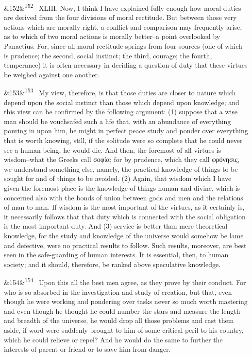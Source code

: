\documentclass[12pt]{article}
\newcommand{\para}[1][]{\par\noindent\ifx&#1&\else\textsuperscript{\footnotesize #1}~\fi}
\begin{document}
\para[152] XLIII. Now, I think I have explained fully enough how moral duties are derived from the four divisions of moral rectitude. But between those very actions which are morally right, a conflict and comparison may frequently arise, as to which of two moral actions is morally better--a point overlooked by Panaetius. For, since all moral rectitude springs from four sources (one of which is prudence; the second, social instinct; the third, courage; the fourth, temperance) it is often necessary in deciding a question of duty that these virtues be weighed against one another.

\para[153] My view, therefore, is that those duties are closer to nature which depend upon the social instinct than those which depend upon knowledge; and this view can be confirmed by the following argument: (1) suppose that a wise man should be vouchsafed such a life that, with an abundance of everything pouring in upon him, he might in perfect peace study and ponder over everything that is worth knowing, still, if the solitude were so complete that he could never see a human being, he would die. And then, the foremost of all virtues is wisdom--what the Greeks call σοφία; for by prudence, which they call φρόνησις, we understand something else, namely, the practical knowledge of things to be sought for and of things to be avoided. (2) Again, that wisdom which I have given the foremost place is the knowledge of things human and divine, which is concerned also with the bonds of union between gods and men and the relations of man to man. If wisdom is the most important of the virtues, as it certainly is, it necessarily follows that that duty which is connected with the social obligation is the most important duty. And (3) service is better than mere theoretical knowledge, for the study and knowledge of the universe would somehow be lame and defective, were no practical results to follow. Such results, moreover, are best seen in the safe-guarding of human interests. It is essential, then, to human society; and it should, therefore, be ranked above speculative knowledge.

\para[154] Upon this all the best men agree, as they prove by their conduct. For who is so absorbed in the investigation and study of creation, but that, even though he were working and pondering over tasks never so much worth mastering and even though he thought he could number the stars and measure the length and breadth of the universe, he would drop all those problems and cast them aside, if word were suddenly brought to him of some critical peril to his country, which he could relieve or repel? And he would do the same to further the interests of parent or friend or to save him from danger.
\end{document}
